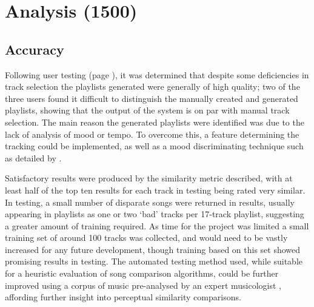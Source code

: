 \chapter{Analysis (1500)}
\begin{comment}
	\item Subject the findings to scrutiny as to what they might mean
	\item Discussion and analysis of the theories, ideas, issues and challenges noted earlier in the writing. Do you have both intended and unintended outcomes?
	\item A `making sense' of the findings by considering their implications for the questions raised
	\item A critique of the research method (data collection tools?) used and their validity and reliability
\end{comment}
\section{Accuracy}
Following user testing (page \pageref{text:testing:user}), it was determined that despite some deficiencies in track selection the playlists generated were generally of high quality; two of the three users found it difficult to distinguish the manually created and generated playlists, showing that the output of the system is on par with manual track selection. The main reason the generated playlists were identified was due to the lack of analysis of mood or tempo. To overcome this, a feature determining the tracking could be implemented, as well as a mood discriminating technique such as detailed by \citet*{Liu2003}.

Satisfactory results were produced by the similarity metric described, with at least half of the top ten results for each track in testing being rated very similar. In testing, a small number of disparate songs were returned in results, usually appearing in playlists as one or two `bad' tracks per 17-track playlist, suggesting a greater amount of training required. As time for the project was limited a small training set of around 100 tracks was collected, and would need to be vastly increased for any future development, though training based on this set showed promising results in testing. The automated testing method used, while suitable for a heuristic evaluation of song comparison algorithms, could be further improved using a corpus of music pre-analysed by an expert musicologist \citep{Muellensiefen2004}, affording further insight into perceptual similarity comparisons.


